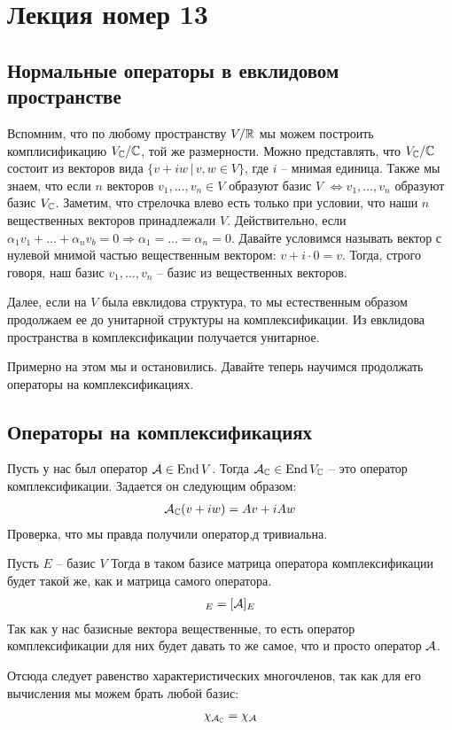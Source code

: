 \section{Лекция номер 13}

\subsection{Нормальные операторы в евклидовом пространстве}

Вспомним, что по любому пространству $V / \mathbb{R}$ мы можем построить комплисификацию $V_{\mathbb{C}} / \mathbb{C}$, той же размерности.
Можно представлять, что $V_{\mathbb{C}} / \mathbb{C}$ состоит из векторов вида $\{ v + iw \, | \, v,w \in V \}$, где $i$ -- мнимая единица. 
Также мы знаем, что если $n$ векторов $v_1, \dots, v_n \in V$ образуют базис $V$ $\Longleftrightarrow v_1, \dots, v_n$ образуют базис $V_{\mathbb{C}}$. 
Заметим, что стрелочка влево есть только при условии, что наши $n$ вещественных векторов принадлежали $V$. 
Действительно, если $\alpha_1 v_1 + \dots + \alpha_n v_b = 0 \Longrightarrow \alpha_1 = \dots = \alpha_n = 0$.
Давайте условимся называть вектор с нулевой мнимой частью вещественным вектором: $v + i \cdot 0 = v$. Тогда, строго говоря, 
наш базис $v_1, \dots, v_n$ -- базис из вещественных векторов. 

Далее, если на $V$ была евклидова структура, то мы естественным образом продолжаем ее до унитарной структуры на комплексификации. 
Из евклидова пространства в комплексификации получается унитарное. 

Примерно на этом мы и остановились. Давайте теперь научимся продолжать операторы на комплексификациях.

\subsection*{Операторы на комплексификациях}

\begin{conj}
Пусть у нас был оператор $\mathcal{A} \in \operatorname{End}{V}$.
Тогда $\mathcal{A}_{\mathbb{C}} \in \operatorname{End}{V_{\mathbb{C}}}$ -- это оператор комплексификации. Задается он следующим образом:
\begin{gather*}
    \mathcal{A}_{\mathbb{C}}(v + iw) = Av + iAw
\end{gather*}
Проверка, что мы правда получили оператор,д тривиальна. 
\end{conj}

\begin{conj}
Пусть $E$ -- базис $V$
Тогда в таком базисе матрица оператора комплексификации будет такой же, как и матрица самого оператора. 
\begin{gather*}
    [\A_{\C}]_{E} = [\A]_{E}
\end{gather*}
Так как у нас базисные вектора вещественные, то есть оператор комплексификации 
для них будет давать то же самое, что и просто оператор $\mathcal{A}$. 

Отсюда следует равенство характеристических многочленов, так как для его вычисления мы можем брать любой базис: 
\begin{gather*}
    \chi_{\mathcal{A}_{\mathbb{C}}} = \chi_{\mathcal{A}}
\end{gather*}
\end{conj}

